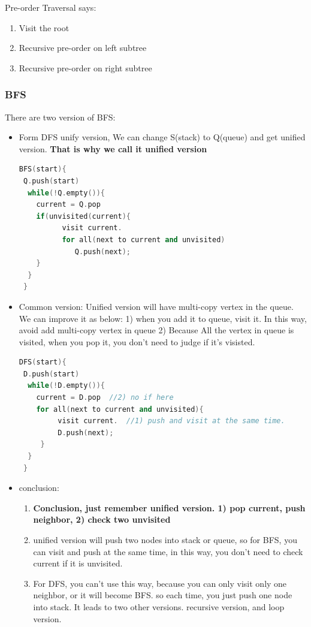 \documentclass[a4paper,11pt,twoside]{book}
\begin{document}
Pre-order Traversal says:
\begin{enumerate}
\item Visit the root
\item Recursive pre-order on left subtree
\item Recursive pre-order on right subtree
\end{enumerate}


\subsubsection{BFS}


\par There are two version of BFS:
\begin{itemize}
\item Form DFS unify version, We can change S(stack) to Q(queue) and get unified version. \textbf{That is why we call it unified version}
\begin{lstlisting}[frame=single, language=c++]
BFS(start){
 Q.push(start)  
  while(!Q.empty()){
    current = Q.pop
    if(unvisited(current){
          visit current.
          for all(next to current and unvisited)
             Q.push(next);
    }
  }
 }
\end{lstlisting} 

\item Common version:  Unified version will have multi-copy vertex in the queue. We can improve it as below:  1) when you add it to queue, visit it. In this way, avoid add multi-copy vertex in queue 2) Because All the vertex in queue is visited, when you pop it, you don't need to judge if it's visisted. 
\begin{lstlisting}[frame=single, language=c++]
DFS(start){
 D.push(start)  
  while(!D.empty()){
    current = D.pop  //2) no if here
    for all(next to current and unvisited){
         visit current.  //1) push and visit at the same time. 
         D.push(next);
     }
  }
 }
\end{lstlisting} 

\item conclusion:
\begin{enumerate}
	
\item  \textbf{Conclusion, just remember unified version. 1) pop current, push neighbor, 2) check two unvisited}
\item unified version will push two nodes into stack or queue, so for BFS, you can visit and push at the same time, in this way, you don't need to check current if it is unvisited. 

\item For DFS, you can't use this way, because you can only visit only one neighbor, or it will become BFS. so each time, you just push one node into stack. It leads to two other versions. recursive version, and loop version. 
\end{enumerate}


\end{itemize}
\end{document}
